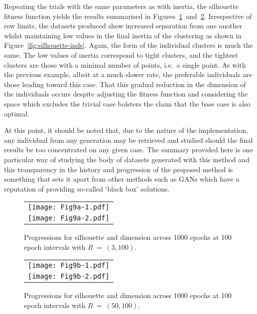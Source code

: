 \documentclass[11pt]{article}
\newlength{\imgwidth}
\begin{document}
Repeating the trials with the same parameters as with inertia, the silhouette
fitness function yields the results summarised in
Figures~\ref{fig:small-silhouette}~and~\ref{fig:large-silhouette}. Irrespective
of row limits, the datasets produced show increased separation from one another
whilst maintaining low values in the final inertia of the clustering as shown in
Figure~\ref{fig:silhouette-inds}. Again, the form of the individual clusters is
much the same. The low values of inertia correspond to tight clusters, and the
tightest clusters are those with a minimal number of points, i.e.\ a single
point. As with the previous example, albeit at a much slower rate, the
preferable individuals are those leading toward this case. That this gradual
reduction in the dimension of the individuals occurs despite adjusting the
fitness function and considering the space which excludes the trivial case
bolsters the claim that the base case is also optimal.

At this point, it should be noted that, due to the nature of the implementation,
any individual from any generation may be retrieved and studied should the final
results be too concentrated on any given case. The summary provided here is one
particular way of studying the body of datasets generated with this method and
this transparency in the history and progression of the proposed method is
something that sets it apart from other methods such as GANs which have a
reputation of providing so-called `black box' solutions.

\addtocounter{figure}{1}
\begin{figure}[htbp]
    \ContinuedFloat%
    \centering
    \begin{tabular}{c}
        \texttt{[image: Fig9a-1.pdf]}
        \\
        \texttt{[image: Fig9a-2.pdf]}
    \end{tabular}
    \caption{%
        Progressions for silhouette and dimension across 1000 epochs at 100
        epoch intervals with \(R~=~(3, 100)\).
    }\label{fig:small-silhouette}
\end{figure}

\begin{figure}
    \ContinuedFloat%
    \centering
    \begin{tabular}{c}
        \texttt{[image: Fig9b-1.pdf]}
        \\
        \texttt{[image: Fig9b-2.pdf]}
    \end{tabular}
    \caption{%
        Progressions for silhouette and dimension across 1000 epochs at 100
        epoch intervals with \(R~=~(50,100)\).
    }\label{fig:large-silhouette}
\end{figure}
\end{document}
